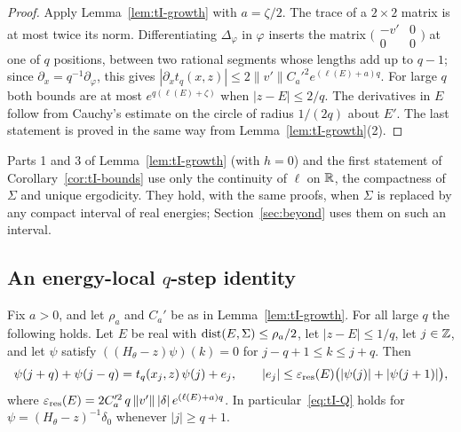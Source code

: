 \begin{proof}
Apply Lemma~\ref{lem:tI-growth} with $a=\zeta/2$. The trace of a $2\times2$ matrix is at most twice its norm. Differentiating $\Delta_\varphi$ in $\varphi$ inserts the matrix $\bigl(\begin{smallmatrix}-v'&0\\0&0\end{smallmatrix}\bigr)$ at one of $q$ positions, between two rational segments whose lengths add up to $q-1$; since $\partial_x=q^{-1}\partial_\varphi$, this gives $|\partial_xt_q(x,z)|\le2\|v'\|C_a'^2e^{(\ell(E)+a)q}$. For large $q$ both bounds are at most $e^{q(\ell(E)+\zeta)}$ when $|z-E|\le2/q$. The derivatives in $E$ follow from Cauchy's estimate on the circle of radius $1/(2q)$ about $E'$. The last statement is proved in the same way from Lemma~\ref{lem:tI-growth}(2).
\end{proof}

Parts 1 and 3 of Lemma~\ref{lem:tI-growth} (with $h=0$) and the first statement of Corollary~\ref{cor:tI-bounds} use only the continuity of $\ell$ on $\mathbb R$, the compactness of $\Sigma$ and unique ergodicity. They hold, with the same proofs, when $\Sigma$ is replaced by any compact interval of real energies; Section~\ref{sec:beyond} uses them on such an interval.

\subsection{An energy-local \texorpdfstring{$q$}{q}-step identity}\label{sec:tI-Q}

\begin{lemma}\label{lem:tI-Q}
Fix $a>0$, and let $\rho_a$ and $C_a'$ be as in Lemma~\ref{lem:tI-growth}. For all large $q$ the following holds. Let $E$ be real with $\operatorname{dist}(E,\Sigma)\le\rho_a/2$, let $|z-E|\le1/q$, let $j\in\mathbb Z$, and let $\psi$ satisfy $((H_\theta-z)\psi)(k)=0$ for $j-q+1\le k\le j+q$. Then
\begin{equation}\label{eq:tI-Q}
\psi(j+q)+\psi(j-q)=t_q(x_j,z)\,\psi(j)+e_j,\qquad |e_j|\le\varepsilon_{\mathrm{res}}(E)\bigl(|\psi(j)|+|\psi(j+1)|\bigr),
\end{equation}
where $\varepsilon_{\mathrm{res}}(E)=2C_a'^2\,q\,\|v'\|\,|\delta|\,e^{(\ell(E)+a)q}$. In particular~\eqref{eq:tI-Q} holds for $\psi=(H_\theta-z)^{-1}\delta_0$ whenever $|j|\ge q+1$.
\end{lemma}

